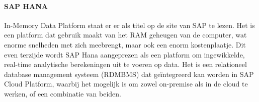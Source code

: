     \paragraph{SAP HANA}
    In-Memory Data Platform staat er er als titel op de site van SAP te lezen. Het is een platform dat gebruik maakt van het RAM geheugen van de computer, wat enorme snelheden met zich meebrengt, maar ook een enorm kostenplaatje. Dit even terzijde wordt SAP Hana aangeprezen als een platform  om ingewikkelde, real-time analytische berekeningen uit te voeren op data.
    Het is een relationeel database management systeem (RDMBMS) dat geïntegreerd kan worden in SAP Cloud Platform, waarbij het mogelijk is om zowel on-premise als in de cloud te werken, of een combinatie van beiden.
